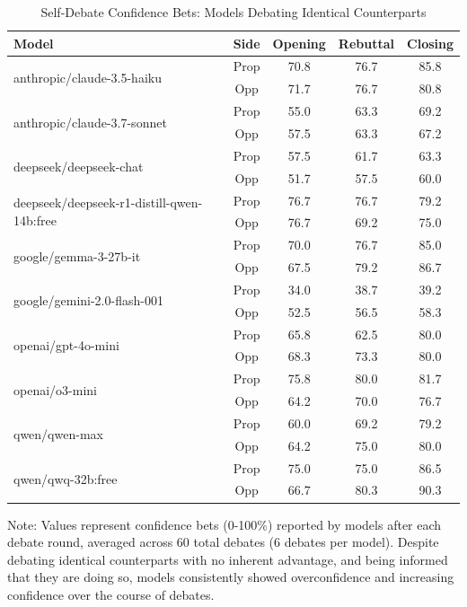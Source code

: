 \documentclass{article}
\begin{document}
\begin{table}[htbp]
  \centering
  \caption{Self-Debate Confidence Bets: Models Debating Identical Counterparts}
  \label{tab:self-debate}
  \begin{tabular}{l|c|ccc}
      \toprule
      \textbf{Model} & \textbf{Side} & \textbf{Opening} & \textbf{Rebuttal} & \textbf{Closing} \\
      \midrule
      \multirow{2}{*}{anthropic/claude-3.5-haiku} & Prop & 70.8 & 76.7 & 85.8 \\
       & Opp & 71.7 & 76.7 & 80.8 \\
      \midrule
      \multirow{2}{*}{anthropic/claude-3.7-sonnet} & Prop & 55.0 & 63.3 & 69.2 \\
       & Opp & 57.5 & 63.3 & 67.2 \\
      \midrule
      \multirow{2}{*}{deepseek/deepseek-chat} & Prop & 57.5 & 61.7 & 63.3 \\
       & Opp & 51.7 & 57.5 & 60.0 \\
      \midrule
      \multirow{2}{*}{deepseek/deepseek-r1-distill-qwen-14b:free} & Prop & 76.7 & 76.7 & 79.2 \\
       & Opp & 76.7 & 69.2 & 75.0 \\
      \midrule
      \multirow{2}{*}{google/gemma-3-27b-it} & Prop & 70.0 & 76.7 & 85.0 \\
       & Opp & 67.5 & 79.2 & 86.7 \\
      \midrule
      \multirow{2}{*}{google/gemini-2.0-flash-001} & Prop & 34.0 & 38.7 & 39.2 \\
       & Opp & 52.5 & 56.5 & 58.3 \\
      \midrule
      \multirow{2}{*}{openai/gpt-4o-mini} & Prop & 65.8 & 62.5 & 80.0 \\
       & Opp & 68.3 & 73.3 & 80.0 \\
      \midrule
      \multirow{2}{*}{openai/o3-mini} & Prop & 75.8 & 80.0 & 81.7 \\
       & Opp & 64.2 & 70.0 & 76.7 \\
      \midrule
      \multirow{2}{*}{qwen/qwen-max} & Prop & 60.0 & 69.2 & 79.2 \\
       & Opp & 64.2 & 75.0 & 80.0 \\
      \midrule
      \multirow{2}{*}{qwen/qwq-32b:free} & Prop & 75.0 & 75.0 & 86.5 \\
       & Opp & 66.7 & 80.3 & 90.3 \\
      \bottomrule
  \end{tabular}
  \begin{tablenotes}
    \small
    \item Note: Values represent confidence bets (0-100\%) reported by models after each debate round, averaged across 60 total debates (6 debates per model). Despite debating identical counterparts with no inherent advantage, and being informed that they are doing so, models consistently showed overconfidence and increasing confidence over the course of debates.
  \end{tablenotes}
\end{table}
\end{document}

